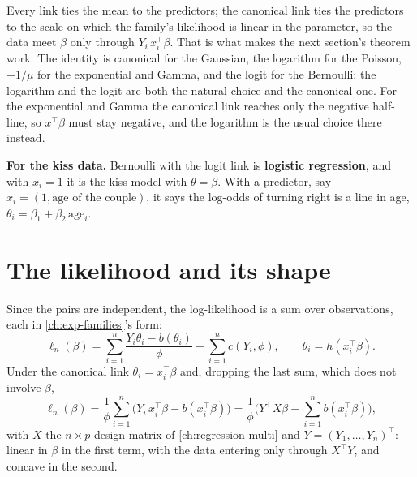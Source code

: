 \begin{inwords}
Every link ties the mean to the predictors; the canonical link ties the predictors to the scale on which the family's likelihood is linear in the parameter, so the data meet $\beta$ only through $Y_i\,x_i^\top\beta$. That is what makes the next section's theorem work. The identity is canonical for the Gaussian, the logarithm for the Poisson, $-1/\mu$ for the exponential and Gamma, and the logit for the Bernoulli: the logarithm and the logit are both the natural choice and the canonical one. For the exponential and Gamma the canonical link reaches only the negative half-line, so $x^\top\beta$ must stay negative, and the logarithm is the usual choice there instead.

\textbf{For the kiss data.} Bernoulli with the logit link is \textbf{logistic regression}, and with $x_i = 1$ it is the kiss model with $\theta = \beta$. With a predictor, say $x_i = (1, \text{age of the couple})$, it says the log-odds of turning right is a line in age, $\theta_i = \beta_1 + \beta_2\,\text{age}_i$.
\end{inwords}

\section{The likelihood and its shape}
\label{sec:glm-likelihood}

Since the pairs are independent, the log-likelihood is a sum over observations, each in \cref{ch:exp-families}'s form:
\[
\ell_n(\beta) = \sum_{i=1}^n \frac{Y_i\theta_i - b(\theta_i)}{\phi} + \sum_{i=1}^n c(Y_i, \phi), \qquad \theta_i = h(x_i^\top\beta).
\]
Under the canonical link $\theta_i = x_i^\top\beta$ and, dropping the last sum, which does not involve $\beta$,
\[
\ell_n(\beta) = \frac{1}{\phi}\sum_{i=1}^n \big(Y_i\,x_i^\top\beta - b(x_i^\top\beta)\big) = \frac{1}{\phi}\Big(Y^\top X\beta - \sum_{i=1}^n b(x_i^\top\beta)\Big),
\]
with $X$ the $n \times p$ design matrix of \cref{ch:regression-multi} and $Y = (Y_1, \ldots, Y_n)^\top$: linear in $\beta$ in the first term, with the data entering only through $X^\top Y$, and concave in the second.

